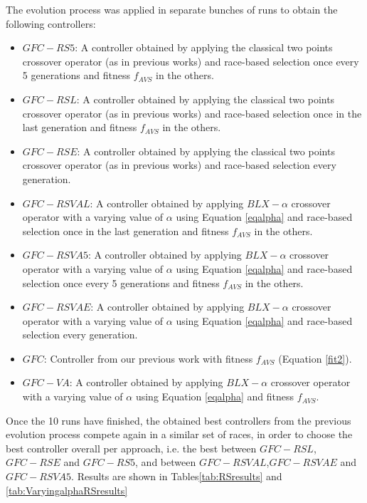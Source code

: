 \documentclass[10pt,journal,compsoc]{IEEEtran}
\begin{document}
The evolution process was applied in separate bunches of runs to obtain the following controllers:
\begin{itemize}
	\item $GFC-RS5$: A controller obtained by applying the classical two points crossover operator (as in previous works) and race-based selection once every 5 generations and fitness $f_{AVS}$ in the others. 
	\item $GFC-RSL$: A controller obtained by applying the classical two points crossover operator (as in previous works) and race-based selection once in the last generation and fitness $f_{AVS}$ in the others. 
	\item $GFC-RSE$: A controller obtained by applying the classical two points crossover operator (as in previous works) and race-based selection every generation. 
	 
	\item $GFC-RSVAL$: A controller obtained by applying $BLX-\alpha$ crossover operator with a varying value of $\alpha$ using Equation \ref{eqalpha} and race-based selection once in the last generation and fitness $f_{AVS}$ in the others. 
	 
	\item $GFC-RSVA5$: A controller obtained by applying $BLX-\alpha$ crossover operator with a varying value of $\alpha$ using Equation \ref{eqalpha} and race-based selection once every 5 generations and fitness $f_{AVS}$ in the others. 
	 
	\item $GFC-RSVAE$: A controller obtained by applying $BLX-\alpha$ crossover operator with a varying value of $\alpha$ using Equation \ref{eqalpha} and race-based selection every generation. 
	
		\item $GFC$: Controller  from our previous work \cite{salem_cig2018} with fitness  $f_{AVS}$ (Equation \ref{fit2}).
	\item $GFC-VA$: A controller obtained by applying $BLX-\alpha$ crossover operator with a varying value of $\alpha$ using Equation \ref{eqalpha} and fitness $f_{AVS}$. 	
\end{itemize}

Once the 10 runs have finished, the obtained best controllers from the previous evolution process  compete again in a similar set of races, in order to choose the best controller overall per approach, i.e. the best between $GFC-RSL$, $GFC-RSE$ and $GFC-RS5$, and between $GFC-RSVAL$,$GFC-RSVAE$ and $GFC-RSVA5$.
Results are shown in Tables\ref{tab:RSresults} and \ref{tab:VaryingalphaRSresults}
\end{document}
